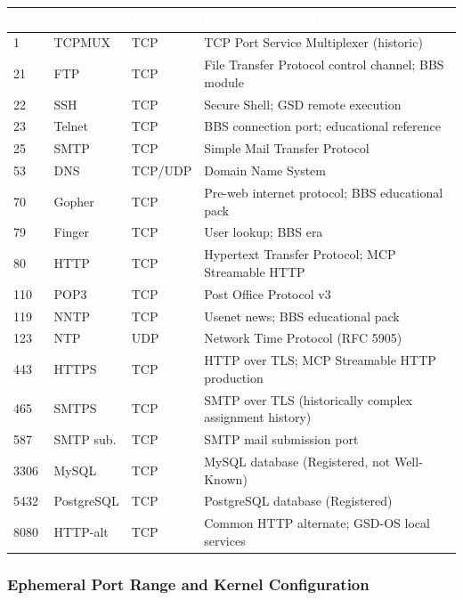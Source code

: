 \documentclass[11pt,letterpaper]{article}
\newcommand{\tableheader}[1]{\textbf{\sffamily\textcolor{white}{#1}}}
\begin{document}
\begin{center}
\begin{tabularx}{\textwidth}{C{1.5cm}L{2cm}L{1.5cm}X}
\toprule
{}
\tableheader{Port} & \tableheader{Service} & \tableheader{Protocol} & \tableheader{Reference / GSD Relevance} \\
 & TCPMUX & TCP & TCP Port Service Multiplexer (historic) \\
21 & FTP & TCP & File Transfer Protocol control channel; BBS module \\
22 & SSH & TCP & Secure Shell; GSD remote execution \\
23 & Telnet & TCP & BBS connection port; educational reference \\
25 & SMTP & TCP & Simple Mail Transfer Protocol \\
53 & DNS & TCP/UDP & Domain Name System \\
70 & Gopher & TCP & Pre-web internet protocol; BBS educational pack \\
79 & Finger & TCP & User lookup; BBS era \\
80 & HTTP & TCP & Hypertext Transfer Protocol; MCP Streamable HTTP \\
110 & POP3 & TCP & Post Office Protocol v3 \\
119 & NNTP & TCP & Usenet news; BBS educational pack \\
123 & NTP & UDP & Network Time Protocol (RFC 5905) \\
443 & HTTPS & TCP & HTTP over TLS; MCP Streamable HTTP production \\
465 & SMTPS & TCP & SMTP over TLS (historically complex assignment history) \\
587 & SMTP sub. & TCP & SMTP mail submission port \\
3306 & MySQL & TCP & MySQL database (Registered, not Well-Known) \\
5432 & PostgreSQL & TCP & PostgreSQL database (Registered) \\
8080 & HTTP-alt & TCP & Common HTTP alternate; GSD-OS local services \\
\bottomrule
\end{tabularx}
\end{center}

\subsubsection{Ephemeral Port Range and Kernel Configuration}
\end{document}
